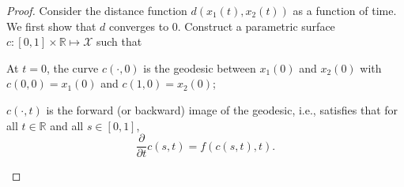 \documentclass[12pt]{article}
\newcommand{\reals}{\mathbb{R}}
\newcommand{\X}{\mathcal{X}}
\begin{document}
\begin{proof}
Consider the distance function $d(x_1(t), x_2(t))$ as a function of time. We first show that $d$ converges to $0$. Construct a parametric surface $c: [0,1] \times \reals \mapsto \X$ such that \begin{inparaenum}[(i)] \item At $t=0$, the curve $c(\cdot,0)$ is the geodesic between $x_1(0)$ and $x_2(0)$ with $c(0,0) = x_1(0)$ and $c(1,0) = x_2(0)$; \item $c(\cdot, t)$ is the forward (or backward) image of the geodesic, i.e., satisfies that for all $t \in \reals$ and all $s \in [0, 1]$,
\begin{equation*}
\frac{\partial}{\partial t} c(s, t) = f(c(s,t), t).
\end{equation*}
\end{inparaenum}


\end{proof}
\end{document}
